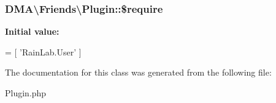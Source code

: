\subsubsection[{\$require}]{\setlength{\rightskip}{0pt plus 5cm}D\+M\+A\textbackslash{}\+Friends\textbackslash{}\+Plugin\+::\$require}\label{classDMA_1_1Friends_1_1Plugin_a3c98aaa659a7b26aaef32d2767f14738}
{\bfseries Initial value\+:}
\begin{DoxyCode}
= [
        \textcolor{stringliteral}{'RainLab.User'}
    ]
\end{DoxyCode}


The documentation for this class was generated from the following file\+:\begin{DoxyCompactItemize}
\item 
Plugin.\+php\end{DoxyCompactItemize}
